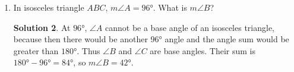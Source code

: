 \documentclass{article}
\theoremstyle{definition}
\newtheorem*{solution}{Solution}
\begin{document}
\begin{multicols}{2}
\begin{enumerate}
\begin{solution}
                We can get the smallest arc by connecting two adjacent point to any other point.
                The arc between two adjacent points on a $36$-gon is $\ang{10}$, so the angle formed is $\ang{5}$.
            \end{solution}
        \item In isosceles triangle $ABC$, $m\angle A = \ang{96}$.
            What is $m\angle B$?
            \begin{solution}
                At $\ang{96}$, $\angle A$ cannot be a base angle of an isosceles triangle, because then there would be another $\ang{96}$ angle and the angle sum would be greater than $\ang{180}$.
                Thus $\angle B$ and $\angle C$ are base angles.
                Their sum is $\ang{180} - \ang{96} = \ang{84}$, so $m\angle B = \ang{42}$.
            \end{solution}
    \end{enumerate}
\end{multicols}
\end{document}
